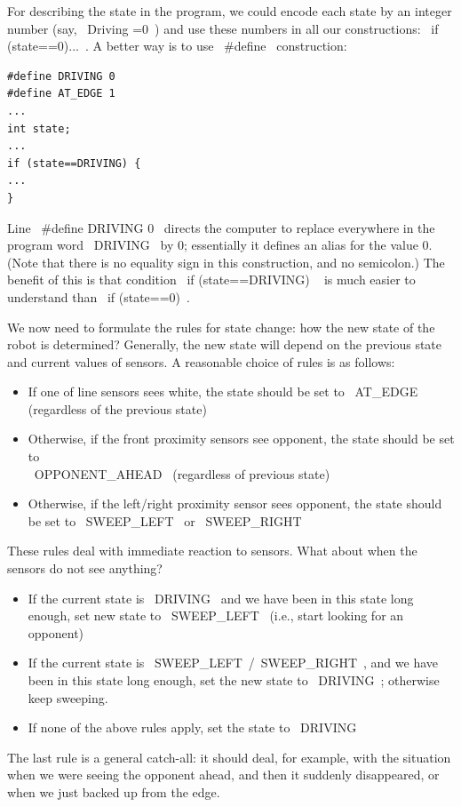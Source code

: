\documentclass[oneside]{stml-l}
\numberwithin{figure}{chapter}
\begin{document}
For describing the state in the program, we could encode each state by an integer
number (say, ~Driving =0~) and use these numbers in all our constructions:
~if (state==0)...~. A better way is to use ~#define~ construction:
\begin{lstlisting}
#define DRIVING 0
#define AT_EDGE 1
...
int state;
...
if (state==DRIVING) {
...
}
\end{lstlisting}
Line ~#define DRIVING 0~ directs the computer to replace everywhere in the program
word ~DRIVING~ by 0; essentially it defines an alias for the value 0. (Note that there is
no equality sign in this construction, and no semicolon.) The benefit of this is that
condition ~if (state==DRIVING) ~ is much easier to understand than ~if (state==0)~.

We now need to formulate the rules for state change: how the new state of the robot
is determined? Generally, the new state will depend on the previous state and current values
of sensors. A reasonable choice of rules is as follows:

\begin{itemize}
\item If one of line sensors sees white, the state should be set to ~AT_EDGE~
    (regardless of the previous state)
\item Otherwise, if the front proximity sensors see opponent, the state should be
set to\\ ~OPPONENT_AHEAD~ (regardless of previous state)
\item Otherwise, if the left/right proximity sensor sees opponent, the state should
be set to ~SWEEP_LEFT~ or ~SWEEP_RIGHT~
\end{itemize}

These rules deal with immediate reaction to sensors. What about when the sensors
do not see anything?

\begin{itemize}
\item If the current state is ~DRIVING~ and we have been in this state long enough,
set new state to ~SWEEP_LEFT~ (i.e., start looking for an opponent)
\item If the current state is ~SWEEP_LEFT~/~SWEEP_RIGHT~, and we have been in
this state long enough, set the new state to ~DRIVING~; otherwise keep sweeping.
\item If none of the above rules apply, set the state to ~DRIVING~
\end{itemize}

The last rule is a general catch-all: it should deal, for example, with the situation
when we were seeing the opponent ahead, and then it suddenly disappeared, or
when we just backed up from the edge.
\end{document}
